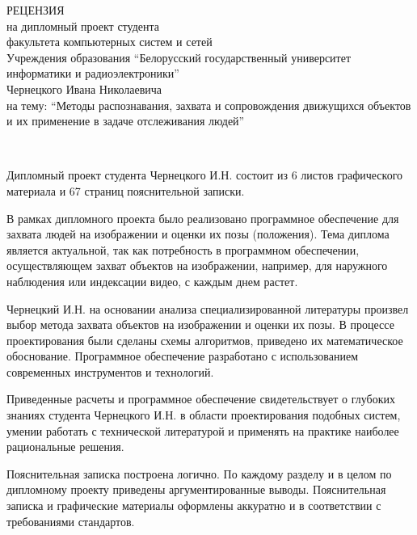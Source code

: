 \thispagestyle{empty}

\begin{singlespace}
  {\small
    \begin{center}
      \begin{minipage}{0.8\textwidth}
        \begin{center}
          {\normalsize РЕЦЕНЗИЯ}\\[0.2cm]
          на дипломный проект студента\\
          факультета компьютерных систем и сетей\\
          Учреждения образования ``Белорусский государственный университет информатики и радиоэлектроники''\\
          Чернецкого Ивана Николаевича\\
          на тему: ``Методы распознавания, захвата и сопровождения движущихся объектов и их применение в задаче отслеживания людей''
        \end{center}
      \end{minipage}\\[3cm]
    \end{center}

    Дипломный проект студента Чернецкого И.Н. состоит из 6 листов графического материала и 67 страниц пояснительной записки.

    В рамках дипломного проекта было реализовано программное обеспечение для захвата людей на изображении и оценки их позы (положения). Тема диплома является актуальной, так как потребность в программном обеспечении, осуществляющем захват объектов на изображении, например, для наружного наблюдения или индексации видео, с каждым днем растет.

   Чернецкий И.Н. на основании анализа специализированной литературы произвел выбор метода захвата объектов на изображении и оценки их позы. В процессе проектирования были сделаны схемы алгоритмов, приведено их математическое обоснование. Программное обеспечение разработано с использованием современных инструментов и технологий.

   Приведенные расчеты и программное обеспечение свидетельствует о глубоких знаниях студента Чернецкого И.Н. в области проектирования подобных систем, умении работать с технической литературой и применять на практике наиболее рациональные решения.

    Пояснительная записка построена логично. По каждому разделу и в целом по дипломному проекту приведены аргументированные выводы. Пояснительная записка и графические материалы оформлены аккуратно и в соответствии с требованиями стандартов.

}
\end{singlespace}
